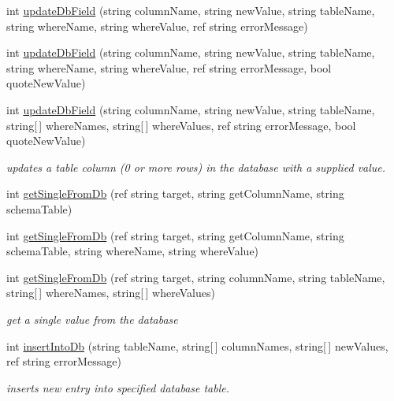 \begin{DoxyCompactItemize}
int \hyperlink{class_ias_pbx_config_1_1_db_helper_a773ba33589b73240e7b71a28b8d794f7}{updateDbField} (string columnName, string newValue, string tableName, string whereName, string whereValue, ref string errorMessage)
\item 
int \hyperlink{class_ias_pbx_config_1_1_db_helper_a20b28dce1dacde9f6bf7b8ae9fc3ec36}{updateDbField} (string columnName, string newValue, string tableName, string whereName, string whereValue, ref string errorMessage, bool quoteNewValue)
\item 
int \hyperlink{class_ias_pbx_config_1_1_db_helper_affab755fb8424c45031cb8d7736799e1}{updateDbField} (string columnName, string newValue, string tableName, string\mbox{[}$\,$\mbox{]} whereNames, string\mbox{[}$\,$\mbox{]} whereValues, ref string errorMessage, bool quoteNewValue)
\begin{DoxyCompactList}\small\item\em updates a table column (0 or more rows) in the database with a supplied value. \item\end{DoxyCompactList}\item 
int \hyperlink{class_ias_pbx_config_1_1_db_helper_a07cb2de735cc96442d59ac4e3abd9ed5}{getSingleFromDb} (ref string target, string getColumnName, string schemaTable)
\item 
int \hyperlink{class_ias_pbx_config_1_1_db_helper_a8a20b88489b781ed779cf683a5005194}{getSingleFromDb} (ref string target, string getColumnName, string schemaTable, string whereName, string whereValue)
\item 
int \hyperlink{class_ias_pbx_config_1_1_db_helper_afee22408d70a9c0f496b8f2957f19379}{getSingleFromDb} (ref string target, string columnName, string tableName, string\mbox{[}$\,$\mbox{]} whereNames, string\mbox{[}$\,$\mbox{]} whereValues)
\begin{DoxyCompactList}\small\item\em get a single value from the database \item\end{DoxyCompactList}\item 
int \hyperlink{class_ias_pbx_config_1_1_db_helper_ae39e091f5a141a7b43c8baca1ec520f2}{insertIntoDb} (string tableName, string\mbox{[}$\,$\mbox{]} columnNames, string\mbox{[}$\,$\mbox{]} newValues, ref string errorMessage)
\begin{DoxyCompactList}\small\item\em inserts new entry into specified database table. \item\end{DoxyCompactList}\item 

\end{DoxyCompactItemize}
